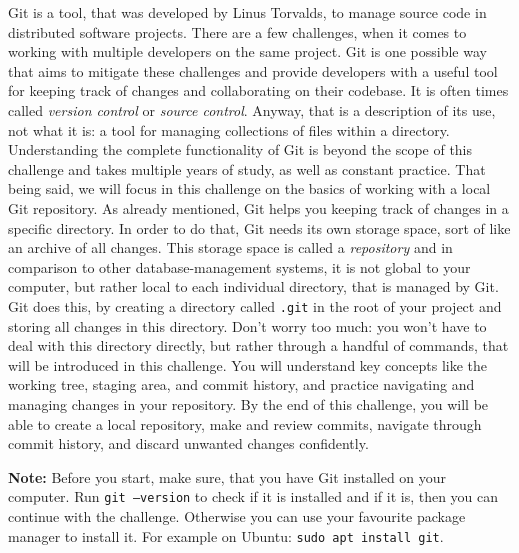 \begin{challenge}
    \begin{chadescription}
    Git is a tool, that was developed by Linus Torvalds, to manage source code in distributed software projects.
    There are a few challenges, when it comes to working with multiple developers on the same project.
    Git is one possible way that aims to mitigate these challenges and provide developers with a useful tool for keeping track of changes and collaborating on their codebase.
    It is often times called \textit{version control} or \textit{source control}.
    Anyway, that is a description of its use, not what it is: a tool for managing collections of files within a directory.
    Understanding the complete functionality of Git is beyond the scope of this challenge and takes multiple years of study, as well as constant practice.
    That being said, we will focus in this challenge on the basics of working with a local Git repository.
    As already mentioned, Git helps you keeping track of changes in a specific directory.
    In order to do that, Git needs its own storage space, sort of like an archive of all changes. 
    This storage space is called a \textit{repository} and in comparison to other database-management systems, it is not global to your computer, but rather local to each individual directory, that is managed by Git.
    Git does this, by creating a directory called \texttt{.git} in the root of your project and storing all changes in this directory.
    Don't worry too much: you won't have to deal with this directory directly, but rather through a handful of commands, that will be introduced in this challenge.
    You will understand key concepts like the working tree, staging area, and commit history, and practice navigating and managing changes in your repository.
    By the end of this challenge, you will be able to create a local repository, make and review commits, navigate through commit history, and discard unwanted changes confidently.

    \textbf{Note:} Before you start, make sure, that you have Git installed on your computer.
    Run \texttt{git --version} to check if it is installed and if it is, then you can continue with the challenge.
    Otherwise you can use your favourite package manager to install it.
    For example on Ubuntu: \texttt{sudo apt install git}.
    \end{chadescription}


\end{challenge}

